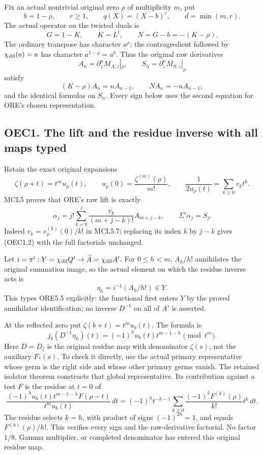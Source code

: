 Fix an actual nontrivial original zero \(\rho\) of multiplicity \(m\),
put \[
 b=1-\rho,\qquad r\ge1,\qquad
 q(X)=(X-b)^r,\qquad d=\min(m,r).
\] The actual operator on the twisted duals is \[
 G=1-K,\qquad K=L^t,\qquad
 N=G-b=-(K-\rho).
 \tag{OEC0.1}
\] The ordinary transpose has character \(a^\rho\); the contragredient
followed by \(\chi_{\rm dil}(a)=a\) has character \(a^{1-\rho}=a^b\).
Thus the original raw derivatives \[
 A_n=\partial_z^nM_{A,z}|_\rho,\qquad
 S_n=\partial_z^nM_{S,z}|_\rho
\] satisfy \[
 (K-\rho)A_n=nA_{n-1},\qquad
 NA_n=-nA_{n-1},
 \tag{OEC0.2}
\] and the identical formulas on \(S_n\). Every sign below uses the
second equation for ORE's chosen representation.

\subsection{OEC1. The lift and the residue inverse with all maps
typed}\label{oec1.-the-lift-and-the-residue-inverse-with-all-maps-typed}

Retain the exact original expansions \[
 \zeta(\rho+t)=t^m u_\rho(t),\qquad
 u_\rho(0)=\frac{\zeta^{(m)}(\rho)}{m!},\qquad
 \frac1{2u_\rho(t)}=\sum_{k\ge0}v_kt^k.
 \tag{OEC1.1}
\] MCL5 proves that ORE's raw lift is exactly \[
 \alpha_j
 =j!\sum_{k=0}^j\frac{v_k}{(m+j-k)!}A_{m+j-k},
 \qquad\Sigma'\alpha_j=S_j.
 \tag{OEC1.2}
\] Indeed \(v_k=v_\rho^{(k)}(0)/k!\) in MCL5.7; replacing its index
\(k\) by \(j-k\) gives (OEC1.2) with the full factorials unchanged.

Let \(i=\pi':Y=\chi_{\rm dil}Q'\to\widetilde A=\chi_{\rm dil}A'\). For
\(0\le h<m\), \(A_h/h!\) annihilates the original summation image, so
the actual element on which the residue inverse acts is \[
 \eta_h=i^{-1}(A_h/h!)\in Y.
\] This types ORE5.5 explicitly: the functional first enters \(Y\) by
the proved annihilator identification; no inverse \(D^{-1}\) on all of
\(A'\) is asserted.

At the reflected zero put \(\zeta(b+t)=t^m u_b(t)\). The formula is \[
 \boxed{
 j_b(D^{-1}\eta_h)(t)
 =(-1)^h u_b(t)t^{m-1-h}\pmod{t^m}.
 }
 \tag{OEC1.3}
\] Here \(D=D_\zeta\) is the original residue map with denominator
\(\zeta(s)\), not the auxiliary \(F_*(s)\). To check it directly, use
the actual primary representative whose germ is the right side and whose
other primary germs vanish. The retained isolator theorem constructs
that global representative. Its contribution against a test \(F\) is the
residue at \(t=0\) of \[
 \frac{(-1)^h u_b(t)t^{m-1-h}F(\rho-t)}
      {t^m u_b(t)}\,dt
 =(-1)^h t^{-h-1}
   \sum_{k\ge0}\frac{(-1)^kF^{(k)}(\rho)}{k!}t^k\,dt .
\] The residue selects \(k=h\), with product of signs \((-1)^{2h}=1\),
and equals \(F^{(h)}(\rho)/h!\). This verifies every sign and the
raw-derivative factorial. No factor \(1/8\), Gamma multiplier, or
completed denominator has entered this original residue map.

